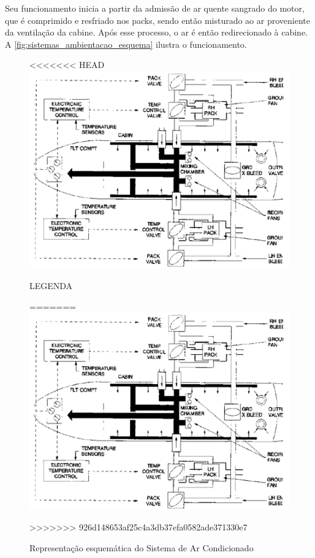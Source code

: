 Seu funcionamento inicia a partir da admissão de ar quente sangrado do motor, que é comprimido e resfriado nos packs, sendo então misturado ao ar proveniente da ventilação da cabine.
Após esse processo, o ar é então redirecionado à cabine.
A \autoref{fig:sistemas_ambientacao_esquema} ilustra o funcionamento.

\begin{figure}
<<<<<<< HEAD
\centering
\includegraphics{images/parte3/sistemas_ambientacao_esquema.png}
\caption{LEGENDA}
=======
\includegraphics[width=\textwidth]{images/parte3/sistemas_ambientacao_esquema.png}
\caption{Representação esquemática do Sistema de Ar Condicionado}
>>>>>>> 926d148653af25c4a3db37efa0582ade371330e7
\label{fig:sistemas_ambientacao_esquema}
\end{figure}

